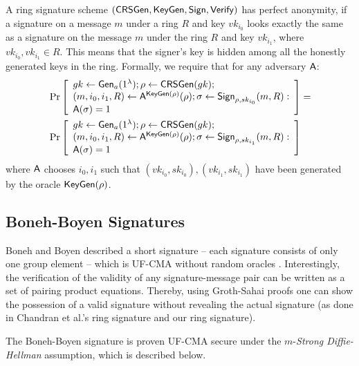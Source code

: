\begin{definition}
A ring signature scheme
$(\mathsf{CRSGen},\allowbreak \mathsf{KeyGen},\allowbreak \mathsf{Sign}, \mathsf{Verify})$ has perfect anonymity, if a signature on a message
$m$ under a ring $R$ and key $vk_{i_0}$
looks exactly the same as a signature on the
message $m$ under the ring $R$ and key $vk_{i_1}$, where $vk_{i_0},vk_{i_1}\in R$. This means that the signer's key is hidden
among all the honestly generated keys in the ring. Formally, we require that for any
adversary $\mathsf{A}$:
\begin{align*}
&\Pr\left[\begin{array}{l}
gk\gets\mathsf{Gen}_a(1^\lambda);\rho\gets\mathsf{CRSGen}(gk);\\
(m,i_0,i_1,R)\gets\mathsf{A}^{\mathsf{KeyGen}(\rho)}(\rho);\sigma\gets\mathsf{Sign}_{\rho,sk_{i_0}}(m,R):\\
\mathsf{A}(\sigma)=1
\end{array}\right]
=\\
&\Pr\left[\begin{array}{l}
gk\gets\mathsf{Gen}_a(1^\lambda);\rho\gets\mathsf{CRSGen}(gk);\\
(m,i_0,i_1,R)\gets\mathsf{A}^{\mathsf{KeyGen}(\rho)}(\rho);\sigma\gets\mathsf{Sign}_{\rho,sk_{i_1}}(m,R):\\
\mathsf{A}(\sigma)=1
\end{array}\right]
\end{align*}
where $\mathsf{A}$ chooses $i_0, i_1$ such that $(vk_{i_0}, sk_{i_0}),(vk_{i_1}, sk_{i_1})$ have been generated by the
oracle $\mathsf{KeyGen}(\rho)$.
\end{definition}

\subsection{Boneh-Boyen Signatures} \label{sec:bbs}

Boneh and Boyen described a short signature -- each signature consists of only one group element -- which is UF-CMA without random oracles \cite{EC:BonBoy04a}. Interestingly, the verification of the validity of any signature-message pair can be written as a set of pairing product equations. Thereby, using Groth-Sahai proofs one can show the possession of a valid signature without revealing the actual signature (as done in Chandran et al.'s ring signature and our ring signature).

The Boneh-Boyen signature is proven UF-CMA secure under the $m$-\emph{Strong Diffie-Hellman} assumption, which is described below.

